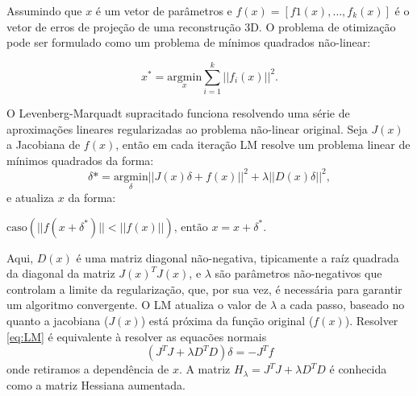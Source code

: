 Assumindo que $x$ é um vetor de parâmetros e $f(x) = [f1(x), \dots, f_k(x)]$ é o vetor de erros de projeção de uma reconstrução 3D. O problema de otimização pode ser  formulado como um problema de mínimos quadrados não-linear:

\begin{equation}
x^* = \underset{x}{\text{argmin}} \sum_{i=1}^k || f_i(x)||^2.
\end{equation}

O Levenberg-Marquadt supracitado funciona resolvendo uma série
de aproximações lineares regularizadas ao problema não-linear original. Seja
$J(x)$ a Jacobiana de $f(x)$, então em cada iteração LM resolve um problema
linear de mínimos quadrados da forma:
\begin{equation}
\label{eq:LM}
\delta* = \underset{\delta}{\text{argmin}} || J(x)\delta + f(x) ||^2 + \lambda ||D(x)\delta||^2,
\end{equation}
e atualiza $x$ da forma:

\begin{algorithm}
\label{LMattX}
\begin{algorithmic}[1]
\State $\text{caso} (||f(x + \delta^*)|| < || f(x) ||) \text{, então}$
\State	 $x = x + \delta^*$.
\end{algorithmic}
\end{algorithm}


Aqui, $D(x)$ é uma matriz diagonal não-negativa, tipicamente a raíz quadrada da
diagonal da matriz $J(x)^T J(x)$, e $\lambda$ são parâmetros não-negativos que
controlam a limite da regularização, que, por sua vez, é necessária para
garantir um algoritmo convergente. O LM atualiza o valor de $\lambda$ a cada
passo, baseado no quanto a jacobiana ($J(x)$) está próxima da função original
($f(x)$).  Resolver \ref{eq:LM} é equivalente à resolver as equacões normais
\begin{equation}
\label{eq:LMNormal}
(J^T J + \lambda D^T D)\delta = -J^T f
\end{equation}
onde retiramos a dependência de $x$. A matriz $H_\lambda = J^T J + \lambda D^T
D$ é conhecida como a matriz Hessiana aumentada. 

